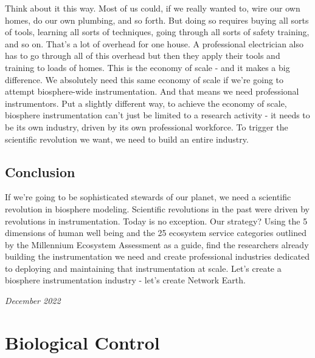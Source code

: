\documentclass[11pt,a5paper]{book}
\begin{document}
Think about it this way. Most of us could, if we really wanted to, wire our own homes, do our own plumbing, and so forth. But doing so requires buying all sorts of tools, learning all sorts of techniques, going through all sorts of safety training, and so on. That's a lot of overhead for one house. A professional electrician also has to go through all of this overhead but then they apply their tools and training to loads of homes. This is the economy of scale - and it makes a big difference. We absolutely need this same economy of scale if we're going to attempt biosphere-wide instrumentation. And that means we need professional instrumentors. Put a slightly different way, to achieve the economy of scale, biosphere instrumentation can't just be limited to a research activity - it needs to be its own industry, driven by its own professional workforce. To trigger the scientific revolution we want, we need to build an entire industry.
\newline

\section{Conclusion}

If we're going to be sophisticated stewards of our planet, we need a scientific revolution in biosphere modeling. Scientific revolutions in the past were driven by revolutions in instrumentation. Today is no exception. Our strategy? Using the 5 dimensions of human well being and the 25 ecosystem service categories outlined by the Millennium Ecosystem Assessment as a guide, find the researchers already building the instrumentation we need and create professional industries dedicated to deploying and maintaining that instrumentation at scale. Let's create a biosphere instrumentation industry - let's create Network Earth.
\newline

\textit{December 2022}

\chapter{Biological Control}
\end{document}
